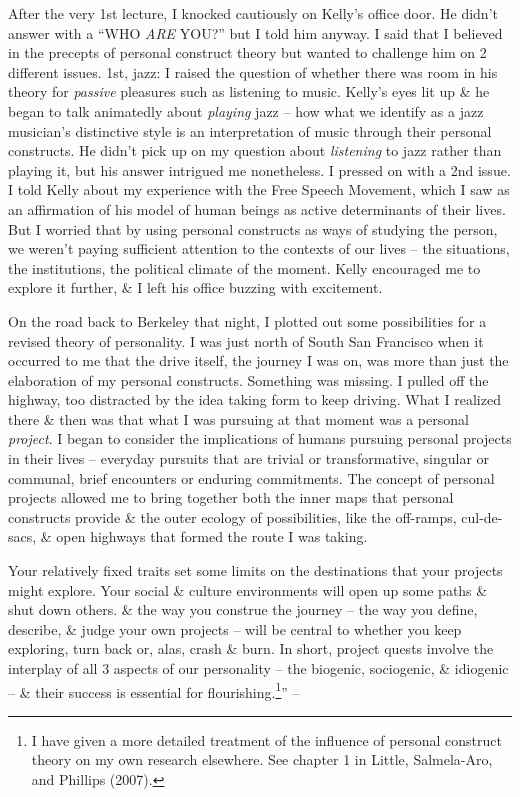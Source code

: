 \documentclass{article}
\numberwithin{equation}{section}
\begin{document}
After the very 1st lecture, I knocked cautiously on Kelly's office door. He didn't answer with a ``WHO \textit{ARE} YOU?'' but I told him anyway. I said that I believed in the precepts of personal construct theory but wanted to challenge him on 2 different issues. 1st, jazz: I raised the question of whether there was room in his theory for \textit{passive} pleasures such as listening to music. Kelly's eyes lit up \& he began to talk animatedly about \textit{playing} jazz -- how what we identify as a jazz musician's distinctive style is an interpretation of music through their personal constructs. He didn't pick up on my question about \textit{listening} to jazz rather than playing it, but his answer intrigued me nonetheless. I pressed on with a 2nd issue. I told Kelly about my experience with the Free Speech Movement, which I saw as an affirmation of his model of human beings as active determinants of their lives. But I worried that by using personal constructs as ways of studying the person, we weren't paying sufficient attention to the contexts of our lives -- the situations, the institutions, the political climate of the moment. Kelly encouraged me to explore it further, \& I left his office buzzing with excitement.

On the road back to Berkeley that night, I plotted out some possibilities for a revised theory of personality. I was just north of South San Francisco when it occurred to me that the drive itself, the journey I was on, was more than just the elaboration of my personal constructs. Something was missing. I pulled off the highway, too distracted by the idea taking form to keep driving. What I realized there \& then was that what I was pursuing at that moment was a personal \textit{project}. I began to consider the implications of humans pursuing personal projects in their lives -- everyday pursuits that are trivial or transformative, singular or communal, brief encounters or enduring commitments. The concept of personal projects allowed me to bring together both the inner maps that personal constructs provide \& the outer ecology of possibilities, like the off-ramps, cul-de-sacs, \& open highways that formed the route I was taking.

Your relatively fixed traits set some limits on the destinations that your projects might explore. Your social \& culture environments will open up some paths \& shut down others. \& the way you construe the journey -- the way you define, describe, \& judge your own projects -- will be central to whether you keep exploring, turn back or, alas, crash \& burn. In short, project quests involve the interplay of all 3 aspects of our personality -- the biogenic, sociogenic, \& idiogenic -- \& their success is essential for flourishing.\footnote{I have given a more detailed treatment of the influence of personal construct theory on my own research elsewhere. See chapter 1 in Little, Salmela-Aro, and Phillips (2007).}'' -- \cite[pp. 25--26]{Little2017}
\end{document}
